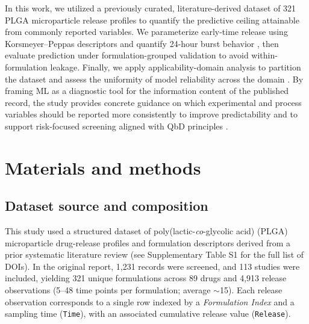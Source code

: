 \documentclass[preprint,12pt,authoryear]{elsarticle}
\begin{document}
In this work, we utilized a previously curated, literature-derived dataset of 321 PLGA microparticle release profiles to quantify the predictive ceiling attainable from commonly reported variables. We parameterize early-time release using Korsmeyer--Peppas descriptors \citep{Korsmeyer1983, RitgerPeppas1987} and quantify 24-hour burst behavior \citep{Yoo2020Burst}, then evaluate prediction under formulation-grouped validation to avoid within-formulation leakage. Finally, we apply applicability-domain analysis to partition the dataset and assess the uniformity of model reliability across the domain \citep{OECD2004QSAR, WeaverGleeson2008, Netzeva2005AD}. By framing ML as a diagnostic tool for the information content of the published record, the study provides concrete guidance on which experimental and process variables should be reported more consistently to improve predictability and to support risk-focused screening aligned with QbD principles \citep{ICHQ8R2}.

\section{Materials and methods}

\subsection{Dataset source and composition}
This study used a structured dataset of poly(lactic-\emph{co}-glycolic acid) (PLGA) microparticle drug-release profiles and formulation descriptors derived from a prior systematic literature review (see Supplementary Table S1 for the full list of DOIs). In the original report, 1{,}231 records were screened, and 113 studies were included, yielding 321 unique formulations across 89 drugs and 4{,}913 release observations (5--48 time points per formulation; average $\sim$15). Each release observation corresponds to a single row indexed by a \textit{Formulation Index} and a sampling time (\texttt{Time}), with an associated cumulative release value (\texttt{Release}).
\end{document}

